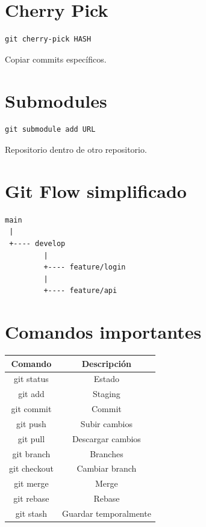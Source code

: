 \documentclass[a4paper,11pt]{article}
\begin{document}
\section*{Cherry Pick}

\begin{lstlisting}
git cherry-pick HASH
\end{lstlisting}

Copiar commits específicos.


\section*{Submodules}

\begin{lstlisting}
git submodule add URL
\end{lstlisting}

Repositorio dentro de otro repositorio.


\section*{Git Flow simplificado}

\begin{lstlisting}
main
 |
 +---- develop
         |
         +---- feature/login
         |
         +---- feature/api
\end{lstlisting}


\section*{Comandos importantes}

\begin{center}
\begin{tabular}{| c | c |}
\hline
Comando & Descripción \\
\hline\hline
git status & Estado \\
\hline
git add & Staging \\
\hline
git commit & Commit \\
\hline
git push & Subir cambios \\
\hline
git pull & Descargar cambios \\
\hline
git branch & Branches \\
\hline
git checkout & Cambiar branch \\
\hline
git merge & Merge \\
\hline
git rebase & Rebase \\
\hline
git stash & Guardar temporalmente \\
\hline
\end{tabular}
\end{center}

\end{document}
